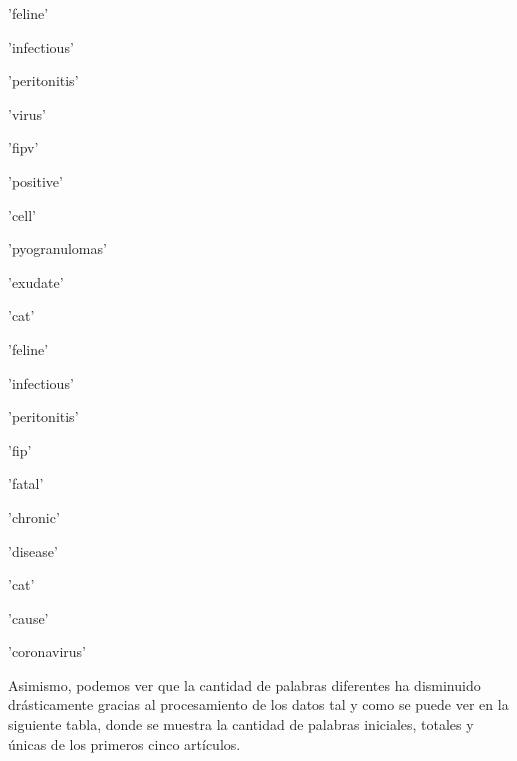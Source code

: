 \documentclass[10pt, a4paper]{article}
\begin{document}
    \begin{enumerate*}
\item 'feline'
\item 'infectious'
\item 'peritonitis'
\item 'virus'
\item 'fipv'
\item 'positive'
\item 'cell'
\item 'pyogranulomas'
\item 'exudate'
\item 'cat'
\end{enumerate*}


    
    \begin{enumerate*}
\item 'feline'
\item 'infectious'
\item 'peritonitis'
\item 'fip'
\item 'fatal'
\item 'chronic'
\item 'disease'
\item 'cat'
\item 'cause'
\item 'coronavirus'
\end{enumerate*}


    
Asimismo, podemos ver que la cantidad de palabras diferentes ha disminuido drásticamente gracias al procesamiento de los datos tal y como se puede ver en la siguiente tabla, donde se muestra la cantidad de palabras iniciales, totales y únicas de los primeros cinco artículos.
\end{document}
